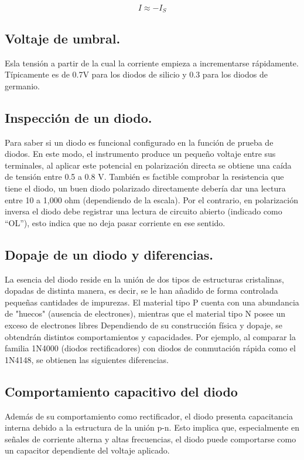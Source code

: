\documentclass[journal]{IEEEtran}
\begin{document}
\[
I \approx -I_S
\]

\subsection{Voltaje de umbral.}
Esla tensión a partir de la cual la corriente empieza a incrementarse rápidamente. Típicamente es de 0.7V para los diodos de silicio y 0.3 para los diodos de germanio.

\subsection{Inspección de un diodo.}
Para saber si un diodo es funcional configurado en la función de prueba de diodos. En este modo, el instrumento produce un pequeño voltaje entre sus terminales, al aplicar este potencial en polarización directa se obtiene una caída de tensión entre 0.5 a 0.8 V. También es factible comprobar la resistencia que tiene el diodo, un buen diodo polarizado directamente debería dar una lectura entre 10 a 1,000 ohm (dependiendo de la escala). Por el contrario, en polarización inversa el diodo debe registrar una lectura de circuito abierto (indicado como “OL”), esto indica que no deja pasar corriente en ese sentido.


\subsection{Dopaje de un diodo y diferencias.}
La esencia del diodo reside en la unión de dos tipos de estructuras cristalinas, dopadas de distinta manera, es decir, se le han añadido de forma controlada
 pequeñas cantidades de impurezas. El material tipo P cuenta con una abundancia de "huecos" (ausencia de electrones), mientras que el material tipo N posee un
  exceso de electrones libres Dependiendo de su construcción física y dopaje, se obtendrán distintos comportamientos y capacidades. Por ejemplo, al comparar la 
  familia 1N4000 (diodos rectificadores) con diodos de conmutación rápida como el 1N4148, se obtienen las siguientes diferencias.

\subsection{Comportamiento capacitivo del diodo}

Además de su comportamiento como rectificador, el diodo presenta capacitancia interna debido a la estructura de la unión p-n. Esto implica que, especialmente en señales de corriente alterna y altas frecuencias, el diodo puede comportarse como un capacitor dependiente del voltaje aplicado.
\end{document}
